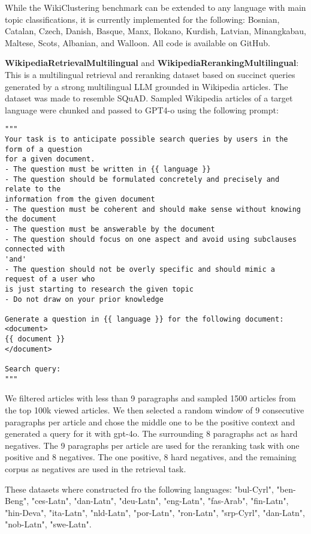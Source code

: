 While the WikiClustering benchmark can be extended to any language with main topic classifications, it is currently implemented for the following: Bosnian, Catalan, Czech, Danish, Basque, Manx, Ilokano, Kurdish, Latvian, Minangkabau, Maltese, Scots, Albanian, and Walloon. All code is available on GitHub.


\textbf{WikipediaRetrievalMultilingual} and \textbf{WikipediaRerankingMultilingual}: This is a multilingual retrieval and reranking dataset based on succinct queries generated by a strong multilingual LLM grounded in Wikipedia articles. The dataset was made to resemble SQuAD. Sampled Wikipedia articles of a target language were chunked and passed to GPT4-o using the following prompt:


\begin{verbatim}
"""
Your task is to anticipate possible search queries by users in the form of a question 
for a given document.
- The question must be written in {{ language }}
- The question should be formulated concretely and precisely and relate to the 
information from the given document
- The question must be coherent and should make sense without knowing the document
- The question must be answerable by the document
- The question should focus on one aspect and avoid using subclauses connected with 
'and'
- The question should not be overly specific and should mimic a request of a user who
is just starting to research the given topic
- Do not draw on your prior knowledge

Generate a question in {{ language }} for the following document:
<document>
{{ document }}
</document>

Search query:
"""
\end{verbatim}

We filtered articles with less than 9 paragraphs and sampled 1500 articles from the top 100k viewed articles. We then selected a random window of 9 consecutive paragraphs per article and chose the middle one to be the positive context and generated a query for it with gpt-4o. The surrounding 8 paragraphs act as hard negatives. The 9 paragraphs per article are used for the reranking task with one positive and 8 negatives. The one positive, 8 hard negatives, and the remaining corpus as negatives are used in the retrieval task.

These datasets where constructed fro the following languages: "bul-Cyrl", "ben-Beng", "ces-Latn", "dan-Latn", "deu-Latn", "eng-Latn", "fas-Arab", "fin-Latn", "hin-Deva", "ita-Latn", "nld-Latn", "por-Latn", "ron-Latn", "srp-Cyrl", "dan-Latn", "nob-Latn", "swe-Latn".

